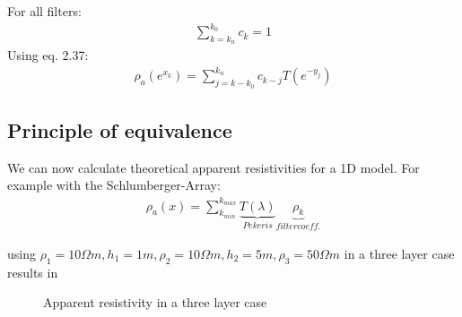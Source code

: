 For all filters:
\begin{align*}
\sum_{k=k_n}^{k_0}c_k=1
\end{align*}
Using eq. 2.37:
\begin{align*}
\rho_a(e^{x_k})=\sum_{j=k-k_0}^{k_n}c_{k-j}T(e^{-y_j})
\end{align*}

\subsection{Principle of equivalence}

We can now calculate theoretical apparent resistivities for a 1D model. For example with the Schlumberger-Array:
\begin{align*}
\rho_a(x)=\sum_{k_{min}}^{k_{max}}\underbrace{T(\lambda)}_{Pekeris}\underbrace{\rho_k}_{filter coeff.}
\end{align*}

using $\rho_1=10\Omega m, h_1=1m, \rho_2=10\Omega m, h_2=5m, \rho_3=50\Omega m$ in a three layer case results in

\begin{figure}[H]
\begin{center}

\caption{Apparent resistivity in a three layer case}
\label{fig:3lcaseappres}
\end{center}
\end{figure}

